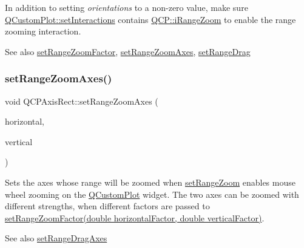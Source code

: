 In addition to setting {\itshape orientations} to a non-\/zero value, make sure \hyperlink{class_q_custom_plot_a5ee1e2f6ae27419deca53e75907c27e5}{Q\+Custom\+Plot\+::set\+Interactions} contains \hyperlink{namespace_q_c_p_a2ad6bb6281c7c2d593d4277b44c2b037abee1e94353525a636aeaf0ba32b72e14}{Q\+C\+P\+::i\+Range\+Zoom} to enable the range zooming interaction.

\begin{DoxySeeAlso}{See also}
\hyperlink{class_q_c_p_axis_rect_a895d7ac745ea614e04056244b3c138ac}{set\+Range\+Zoom\+Factor}, \hyperlink{class_q_c_p_axis_rect_a9442cca2aa358405f39a64d51eca13d2}{set\+Range\+Zoom\+Axes}, \hyperlink{class_q_c_p_axis_rect_ae6aef2f7211ba6097c925dcd26008418}{set\+Range\+Drag} 
\end{DoxySeeAlso}
\hypertarget{class_q_c_p_axis_rect_a9442cca2aa358405f39a64d51eca13d2}{}\label{class_q_c_p_axis_rect_a9442cca2aa358405f39a64d51eca13d2} 
\subsubsection{\texorpdfstring{set\+Range\+Zoom\+Axes()}{setRangeZoomAxes()}}
{\footnotesize\ttfamily void Q\+C\+P\+Axis\+Rect\+::set\+Range\+Zoom\+Axes (\begin{DoxyParamCaption}\item[{\hyperlink{class_q_c_p_axis}{Q\+C\+P\+Axis} $\ast$}]{horizontal,  }\item[{\hyperlink{class_q_c_p_axis}{Q\+C\+P\+Axis} $\ast$}]{vertical }\end{DoxyParamCaption})}

Sets the axes whose range will be zoomed when \hyperlink{class_q_c_p_axis_rect_a7960a9d222f1c31d558b064b60f86a31}{set\+Range\+Zoom} enables mouse wheel zooming on the \hyperlink{class_q_custom_plot}{Q\+Custom\+Plot} widget. The two axes can be zoomed with different strengths, when different factors are passed to \hyperlink{class_q_c_p_axis_rect_a895d7ac745ea614e04056244b3c138ac}{set\+Range\+Zoom\+Factor(double horizontal\+Factor, double vertical\+Factor)}.

\begin{DoxySeeAlso}{See also}
\hyperlink{class_q_c_p_axis_rect_a648cce336bd99daac4a5ca3e5743775d}{set\+Range\+Drag\+Axes} 
\end{DoxySeeAlso}
\hypertarget{class_q_c_p_axis_rect_a895d7ac745ea614e04056244b3c138ac}{}\label{class_q_c_p_axis_rect_a895d7ac745ea614e04056244b3c138ac} 
